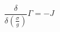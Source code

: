 \begin{equation}  \label{29}
\frac{\delta}{\delta\left(\frac{\sigma}{g}\right)}\Gamma=-J
\end{equation}

